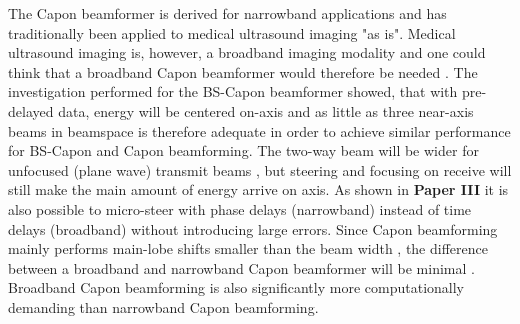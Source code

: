 The Capon beamformer is derived for narrowband applications and has traditionally been applied to medical ultrasound imaging "as is". Medical ultrasound imaging is, however, a broadband imaging modality and one could think that a broadband Capon beamformer would therefore be needed \cite{Holfort2009}. The investigation performed for the BS-Capon beamformer \cite{Nilsen2009} showed, that with pre-delayed data, energy will be centered on-axis and as little as three near-axis beams in beamspace is therefore adequate in order to achieve similar performance for BS-Capon and Capon beamforming. The two-way beam will be wider for unfocused (plane wave) transmit beams \cite{Holfort2009, Austeng2011}, but steering and focusing on receive will still make the main amount of energy arrive on axis. As shown in \textbf{Paper III} it is also possible to micro-steer with phase delays (narrowband) instead of time delays (broadband) without introducing large errors. Since Capon beamforming mainly performs main-lobe shifts smaller than the beam width \cite{Synnevag2011, Nilsen2009}, the difference between a broadband and narrowband Capon beamformer will be minimal \cite{Diamantis2014}. Broadband Capon beamforming is also significantly more computationally demanding than narrowband Capon beamforming.


																						


